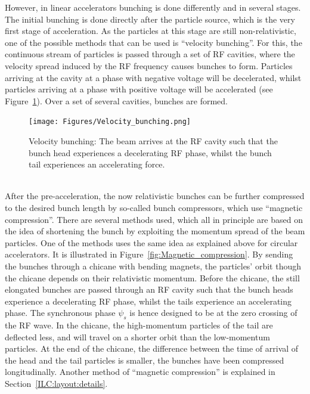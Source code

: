 However, in linear accelerators bunching is done differently and in several stages.
The initial bunching is done directly after the particle source, which is the very first stage of acceleration.
As the particles at this stage are still non-relativistic, one of the possible methods that can be used is ``velocity bunching''. 
For this, the continuous stream of particles is passed through a set of RF cavities, where the velocity spread induced by the RF frequency causes bunches to form.
Particles arriving at the cavity at a phase with negative voltage will be decelerated, whilst particles arriving at a phase with positive voltage will be accelerated (see Figure~\ref{fig:Velocity_bunching}).
Over a set of several cavities, bunches are formed.
\begin{figure}
\centering
\texttt{[image: Figures/Velocity\_bunching.png]}
\caption[Velocity bunching]{Velocity bunching: The beam arrives at the RF cavity such that the bunch head experiences a decelerating RF phase, whilst the bunch tail experiences an accelerating force.}
\label{fig:Velocity_bunching}
\end{figure}
\\After the pre-acceleration, the now relativistic bunches can be further compressed to the desired bunch length by so-called bunch compressors, which use ``magnetic compression''. 
There are several methods used, which all in principle are based on the idea of shortening the bunch by exploiting the momentum spread of the beam particles.
One of the methods uses the same idea as explained above for circular accelerators.
It is illustrated in Figure~\ref{fig:Magnetic_compression}.
By sending the bunches through a chicane with bending magnets, the particles' orbit though the chicane depends on their relativistic momentum.
Before the chicane, the still elongated bunches are passed through an RF cavity such that the bunch heads experience a decelerating RF phase, whilst the tails experience an accelerating phase.
The synchronous phase $\psi_s$ is hence designed to be at the zero crossing of the RF wave.
In the chicane, the high-momentum particles of the tail are deflected less, and will travel on a shorter orbit than the low-momentum particles.
At the end of the chicane, the difference between the time of arrival of the head and the tail particles is smaller, the bunches have been compressed longitudinally.
Another method of ``magnetic compression'' is explained in Section~\ref{ILC:layout:details}.
